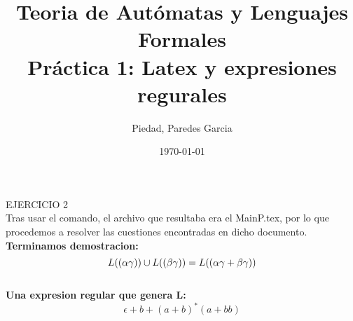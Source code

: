 \documentclass[fleqn, 10pt]{article}
\title{Teoria de Autómatas y Lenguajes Formales \\[.4\baselineskip] Práctica 1: Latex y expresiones regurales}
\author{Piedad, Paredes Garcia}
\date{\today}
\begin{document}
\maketitle

EJERCICIO 2
\\[.8\baselineskip]
Tras usar el comando, el archivo que resultaba era el MainP.tex, por lo que procedemos a resolver las cuestiones encontradas en dicho documento.
\\[.8\baselineskip]
\textbf{Terminamos demostracion:}
$$\\L((\alpha\gamma))\cup L((\beta\gamma))=
L((\alpha\gamma+\beta\gamma))$$
\\[.8\baselineskip]
\textbf{Una expresion regular que genera L:}\\
 $$\epsilon + b + (a+b)^ *(a+bb)$$
\end{document}
